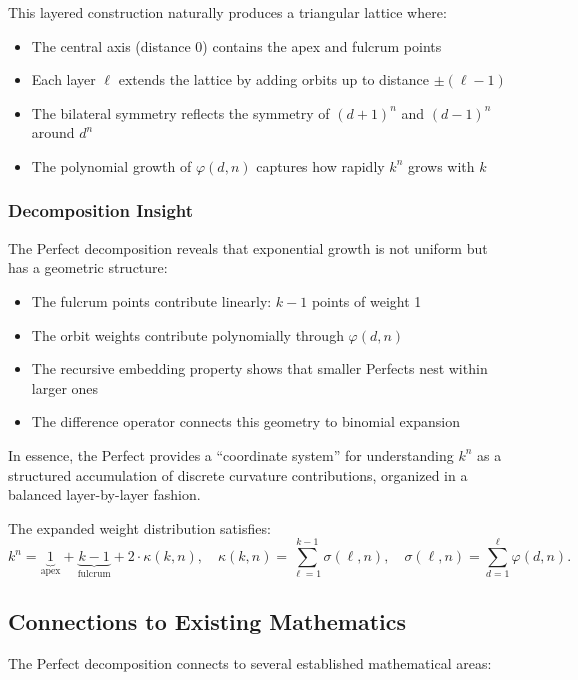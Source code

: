 \documentclass[11pt]{article}
\begin{document}
This layered construction naturally produces a triangular lattice where:
\begin{itemize}
    \item The central axis (distance 0) contains the apex and fulcrum points
    \item Each layer $\ell$ extends the lattice by adding orbits up to distance $\pm(\ell-1)$
    \item The bilateral symmetry reflects the symmetry of $(d+1)^n$ and $(d-1)^n$ around $d^n$
    \item The polynomial growth of $\varphi(d,n)$ captures how rapidly $k^n$ grows with $k$
\end{itemize}

\subsubsection*{Decomposition Insight}
The Perfect decomposition reveals that exponential growth is not uniform but has a geometric structure:
\begin{itemize}
    \item The fulcrum points contribute linearly: $k-1$ points of weight 1
    \item The orbit weights contribute polynomially through $\varphi(d,n)$
    \item The recursive embedding property shows that smaller Perfects nest within larger ones
    \item The difference operator connects this geometry to binomial expansion
\end{itemize}

In essence, the Perfect provides a ``coordinate system'' for understanding $k^n$ as a structured accumulation of discrete curvature contributions, organized in a balanced layer-by-layer fashion.

The expanded weight distribution satisfies:
\[
k^{n} = \underbrace{1}_{\text{apex}} + \underbrace{k-1}_{\text{fulcrum}} + 2 \cdot \kappa(k,n), \quad 
\kappa(k,n) = \sum_{\ell=1}^{k-1} \sigma(\ell,n), \quad 
\sigma(\ell,n) = \sum_{d=1}^{\ell} \varphi(d,n).
\]

\subsection{Connections to Existing Mathematics}

The Perfect decomposition connects to several established mathematical areas:
\end{document}
